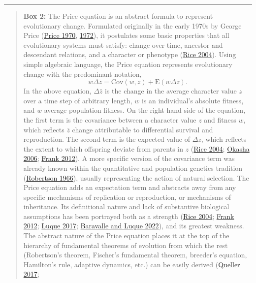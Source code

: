 \documentclass[
]{article}
\begin{document}
\begin{center}\rule{0.5\linewidth}{0.5pt}\end{center}

\begin{quote}
\textbf{Box 2:} The Price equation is an abstract formula to represent
evolutionary change. Formulated originally in the early 1970s by George
Price (\protect\hyperlink{ref-Price1970}{Price 1970},
\protect\hyperlink{ref-Price1972}{1972}), it postulates some basic
properties that all evolutionary systems must satisfy: change over time,
ancestor and descendant relations, and a character or phenotype
(\protect\hyperlink{ref-Rice2004}{Rice 2004}). Using simple algebraic
language, the Price equation represents evolutionary change with the
predominant notation,
\[\bar{w}\Delta\bar{z} = \mathrm{Cov}\left(w, z\right) + \mathrm{E}\left(w\Delta z\right).\]
In the above equation, \(\Delta\bar{z}\) is the change in the average
character value \(z\) over a time step of arbitrary length, \(w\) is an
individual's absolute fitness, and \(\bar{w}\) average population
fitness. On the right-hand side of the equation, the first term is the
covariance between a character value \(z\) and fitness \(w\), which
reflects \(\bar{z}\) change attributable to differential survival and
reproduction. The second term is the expected value of \(\Delta z\),
which reflects the extent to which offspring deviate from parents in
\(z\) (\protect\hyperlink{ref-Rice2004}{Rice 2004};
\protect\hyperlink{ref-Okasha2006}{Okasha 2006};
\protect\hyperlink{ref-Frank2012}{Frank 2012}). A more specific version
of the covariance term was already known within the quantitative and
population genetics tradition
(\protect\hyperlink{ref-Robertson1966}{Robertson 1966}), usually
representing the action of natural selection. The Price equation adds an
expectation term and abstracts away from any specific mechanisms of
replication or reproduction, or mechanisms of inheritance. Its
definitional nature and lack of substantive biological assumptions has
been portrayed both as a strength (\protect\hyperlink{ref-Rice2004}{Rice
2004}; \protect\hyperlink{ref-Frank2012}{Frank 2012};
\protect\hyperlink{ref-Luque2016}{Luque 2017};
\protect\hyperlink{ref-Baravalle2022}{Baravalle and Luque 2022}), and
its greatest weakness. The abstract nature of the Price equation places
it at the top of the hierarchy of fundamental theorems of evolution from
which the rest (Robertson's theorem, Fischer's fundamental theorem,
breeder's equation, Hamilton's rule, adaptive dynamics, etc.) can be
easily derived (\protect\hyperlink{ref-Queller2017}{Queller 2017};

\end{quote}
\end{document}
